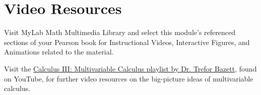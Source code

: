 \documentclass{ximera}
\begin{document}
\section{Video Resources}

Visit MyLab Math Multimedia Library and select this module's referenced sections of your Pearson book for Instructional Videos, Interactive Figures, and Animations related to the material.

Visit the \href{https://www.youtube.com/playlist?list=PLHXZ9OQGMqxc_CvEy7xBKRQr6I214QJcd}{Calculus III: Multivariable Calculus playlist by Dr. Trefor Bazett}, found on YouTube, for further video resources on the big-picture ideas of multivariable calculus.
\end{document}
